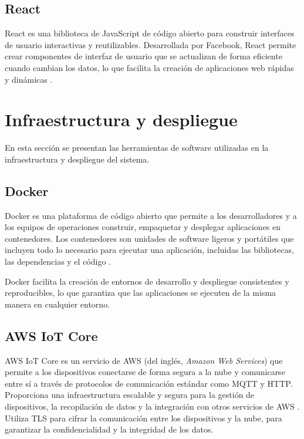 \subsection{React}

React es una biblioteca de JavaScript de código abierto para construir
interfaces de usuario interactivas y reutilizables. Desarrollada por Facebook,
React permite crear componentes de interfaz de usuario que se actualizan de
forma eficiente cuando cambian los datos, lo que facilita la creación de
aplicaciones web rápidas y dinámicas \cite{React}.


\section{Infraestructura y despliegue}

En esta sección se presentan las herramientas de software utilizadas en la
infraestructura y despliegue del sistema.
\subsection{Docker}

Docker es una plataforma de código abierto que permite a los desarrolladores y
a los equipos de operaciones construir, empaquetar y desplegar aplicaciones en
contenedores. Los contenedores son unidades de software ligeros y portátiles
que incluyen todo lo necesario para ejecutar una aplicación, incluidas las
bibliotecas, las dependencias y el código \cite{Docker}.

Docker facilita la creación de entornos de desarrollo y despliegue consistentes
y reproducibles, lo que garantiza que las aplicaciones se ejecuten de la misma
manera en cualquier entorno.

\subsection{AWS IoT Core}

AWS IoT Core es un servicio de AWS (del inglés, \textit{Amazon Web Services})
que permite a los dispositivos conectarse de forma segura a la nube y
comunicarse entre sí a través de protocolos de comunicación estándar como MQTT
y HTTP. Proporciona una infraestructura escalable y segura para la gestión de
dispositivos, la recopilación de datos y la integración con otros servicios de
AWS \cite{AWS_IoT}. Utiliza TLS para cifrar la comunicación entre los
dispositivos y la nube, para garantizar la confidencialidad y la integridad de
los datos.

